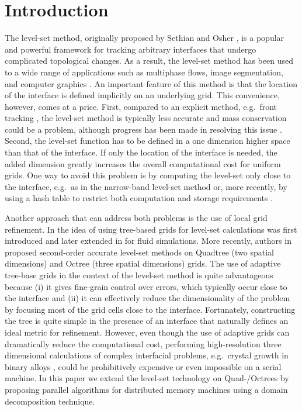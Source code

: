 \section{Introduction}\label{sec:introduction}
The level-set method, originally proposed by Sethian and Osher \cite{Osher;Sethian:88:Fronts-Propagating-w}, is a popular and powerful framework for tracking arbitrary interfaces that undergo complicated topological changes. As a result, the level-set method has been used to a wide range of applications such as multiphase flows, image segmentation, and computer graphics \cite{Osher;Fedkiw:02:Level-Set-Methods-an,Sethian:99:Level-set-methods-an}. An important feature of this method is that the location of the interface is defined implicitly on an underlying grid. This convenience, however, comes at a price. First, compared to an explicit method, e.g.\ front tracking \cite{Juric:96:A-Front-Tracking-Met, Tryggvason;Bunner;Esmaeeli;etal:01:A-Front-Tracking-Met}, the level-set method is typically less accurate and mass conservation could be a problem, although progress has been made in resolving this issue \cite{Enright;Fedkiw;Ferziger;etal:02:A-Hybrid-Particle-Le}. Second, the level-set function has to be defined in a one dimension higher space than that of the interface. If only the location of the interface is needed, the added dimension greatly increases the overall computational cost for uniform grids. One way to avoid this problem is by computing the level-set only close to the interface, e.g.\ as in the narrow-band level-set method \cite{Adalsteinsson;Sethian:95:A-Fast-Level-Set-Met} or, more recently, by using a hash table to restrict both computation and storage requirements \cite{Brun;Guittet;Gibou:12:A-local-level-set-me}.

Another approach that can address both problems is the use of local grid refinement. In \cite{Strain:99:Tree-Methods-for-Mov} the idea of using tree-based grids for level-set calculations was first introduced and later extended in \cite{Popinet:03:Gerris:-A-Tree-Based, Losasso;Gibou;Fedkiw:04:Simulating-Water-and} for fluid simulations. More recently, authors in \cite{Min;Gibou:07:A-second-order-accur} proposed second-order accurate level-set methods on Quadtree (two spatial dimensions) and Octree (three spatial dimensions) grids. The use of adaptive tree-base grids in the context of the level-set method is quite advantageous because (i) it gives fine-grain control over errors, which typically occur close to the interface and (ii) it can effectively reduce the dimensionality of the problem by focusing most of the grid cells close to the interface. Fortunately, constructing the tree is quite simple in the presence of an interface that naturally defines an ideal metric for refinement. However, even though the use of adaptive grids can dramatically reduce the computational cost, performing high-resolution three dimensional calculations of complex interfacial problems, e.g.\ crystal growth in binary alloys \cite{Theillard;Gibou;Pollock:14:A-Sharp-Computationa}, could be prohibitively expensive or even impossible on a serial machine.
In this paper we extend the level-set technology on Quad-/Octrees by proposing
parallel algorithms for distributed memory machines using a domain
decomposition technique.

